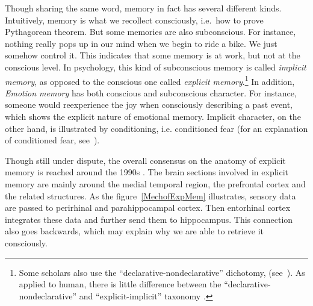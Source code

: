 \documentclass{article}
\begin{document}
Though sharing the same word, memory in fact has several different kinds. Intuitively, memory is what we recollect consciously, i.e.\ how to prove Pythagorean theorem. But some memories are also subconscious. For instance, nothing really pops up in our mind when we begin to ride a bike. We just somehow control it. This indicates that some memory is at work, but not at the conscious level. In psychology, this kind of subconscious memory is called \textit{implicit memory}, as opposed to the conscious one called \textit{explicit memory}.\footnote{Some scholars also use the ``declarative-nondeclarative'' dichotomy, (see~\cite{michaelianMemory2017}). As applied to human, there is little difference between the ``declarative-nondeclarative'' and ``explicit-implicit'' taxonomy \autocite[p.480]{kolbIntroductionBrainBehavior2019}.} In addition, \textit{Emotion memory} has both conscious and subconscious character. For instance, someone would reexperience the joy when consciously describing a past event, which shows the explicit nature of emotional memory. Implicit character, on the other hand, is illustrated by conditioning, i.e. conditioned fear (for an explanation of conditioned fear, see~\cite[p.478]{kolbIntroductionBrainBehavior2019}). 

Though still under dispute, the overall consensus on the anatomy of explicit memory is reached around the 1990s \autocite[p. 207]{kolbIntroductionBrainBehavior2019}. The brain sections involved in explicit memory are mainly around the medial temporal region, the prefrontal cortex and the related structures. As the figure~\ref{MechofExpMem} illustrates, sensory data are passed to perirhinal and parahippocampal cortex. Then entorhinal cortex integrates these data and further send them to hippocampus. This connection also goes backwards, which may explain why we are able to retrieve it consciously. 
\end{document}
